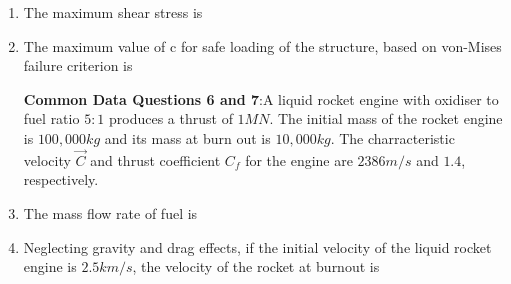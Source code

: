 \documentclass[journal,12pt,onecolumn]{IEEEtran}
\theoremstyle{remark}
\begin{document}
\begin{enumerate}
\item  The maximum shear stress is 
\begin{enumerate}
\end{enumerate}

\item The maximum value of c for safe loading of the structure, based on von-Mises failure criterion is 
\begin{enumerate}
\end{enumerate}

\textbf{Common Data Questions 6 and 7}:A liquid rocket engine with oxidiser to fuel ratio $5:1$ produces a thrust of $1 MN$. The initial mass of the rocket engine is $ 100,000 kg$ and its mass at burn out is $ 10,000kg $. The charracteristic velocity $\vec{C}$ and thrust coefficient $C_{f}$ for the engine are $2386 m/s$  and $1.4$, respectively.

\item The mass flow rate of fuel is 
\begin{enumerate}
\end{enumerate}

\item Neglecting gravity and drag effects, if the initial velocity of the liquid rocket engine is $2.5 km/s $, the velocity of the rocket at burnout is
\begin{enumerate}
\end{enumerate}


\end{enumerate}
\end{document}
